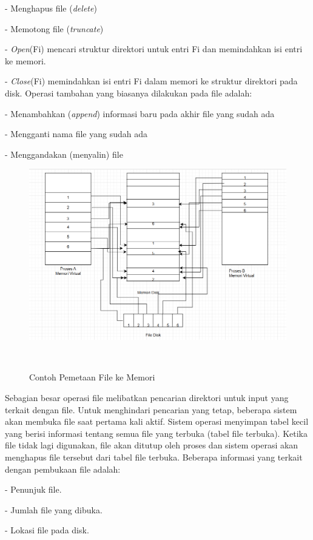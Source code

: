 \documentclass[12pt]{article}
\begin{document}
\begin{itemize}
     		- Menghapus file (\textit{delete}) 
    
        	- Memotong file (\textit{truncate})  
    
        	- \textit{Open}(Fi) mencari struktur direktori untuk entri Fi dan memindahkan isi entri ke memori. 
    
     		- \textit{Close}(Fi) memindahkan isi entri Fi dalam memori ke struktur direktori pada disk. 
     		   Operasi tambahan yang biasanya dilakukan pada file 
                  adalah: 
    
     		- Menambahkan (\textit{append}) informasi baru pada akhir file yang sudah ada 
    
     		- Mengganti nama file yang sudah ada 
    
     		- Menggandakan (menyalin) file
       
                \begin{figure}[h]
                            \centering
                            \includegraphics[width=0.5\linewidth]
                            {asset/gambarfilesystem.png}
                            \caption{Contoh Pemetaan File ke Memori}
                            \label{fig:deadlock-RAG}
                            \end{figure}
       
              Sebagian besar operasi file melibatkan pencarian direktori untuk input yang terkait dengan file. Untuk menghindari pencarian yang tetap, beberapa sistem akan membuka file saat pertama kali aktif. Sistem operasi menyimpan tabel kecil yang berisi informasi tentang semua file yang terbuka (tabel file terbuka). Ketika file tidak lagi digunakan, file akan ditutup oleh proses dan sistem operasi akan menghapus file tersebut dari tabel file terbuka. Beberapa informasi yang terkait dengan pembukaan file adalah: 
    
     		 - Penunjuk file. 
    
     		 - Jumlah file yang dibuka. 
    
     		 - Lokasi file pada disk. 
    

\end{itemize}
\end{document}
